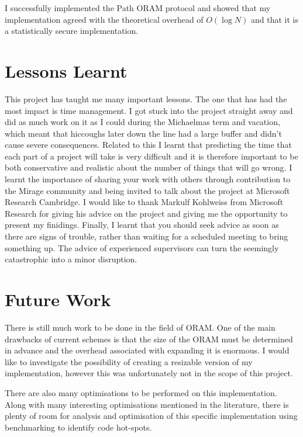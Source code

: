 \documentclass[12pt,a4paper,twoside,openright]{report}
\begin{document}
I successfully implemented the Path ORAM protocol and showed that my implementation agreed with the theoretical overhead of $O(\log N)$ and that it is a statistically secure implementation.

\section{Lessons Learnt}

This project has taught me many important lessons. The one that has had the most impact is time management. I got stuck into the project straight away and did as much work on it as I could during the Michaelmas term and vacation, which meant that hiccoughs later down the line had a large buffer and didn't cause severe consequences. Related to this I learnt that predicting the time that each part of a project will take is very difficult and it is therefore important to be both conservative and realistic about the number of things that will go wrong. I learnt the importance of sharing your work with others through contribution to the Mirage community and being invited to talk about the project at Microsoft Research Cambridge. I would like to thank Markulf Kohlweiss from Microsoft Research for giving his advice on the project and giving me the opportunity to present my finidings. Finally, I learnt that you should seek advice as soon as there are signs of trouble, rather than waiting for a scheduled meeting to bring something up. The advice of experienced supervisors can turn the seemingly catastrophic into a minor disruption.

\section{Future Work}

There is still much work to be done in the field of ORAM. One of the main drawbacks of current schemes is that the size of the ORAM must be determined in advance and the overhead associated with expanding it is enormous. I would like to investigate the possibility of creating a resizable version of my implementation, however this was unfortunately not in the scope of this project.

There are also many optimisations to be performed on this implementation. Along with many interesting optimisations mentioned in the literature, there is plenty of room for analysis and optimisation of this specific implementation using benchmarking to identify code hot-spots.
\end{document}
